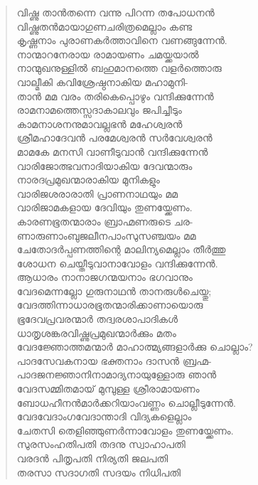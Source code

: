 \begin{verse}
വിഷ്ണു താന്‍തന്നെ വന്നു പിറന്ന തപോധനന്‍\\
വിഷ്ണുതന്‍മായാഗുണചരിത്രമെല്ലാം കണ്ട\\
കൃഷ്ണനാം പുരാണകര്‍ത്താവിനെ വണങ്ങുന്നേന്‍.\\
നാന്മാറനേരായ രാമായണം ചമയ്ക്കയാല്‍\\
നാന്മുഖനുള്ളില്‍ ബഹുമാനത്തെ വളര്‍ത്തൊരു\\
വാല്മീകി കവിശ്രേഷ്ഠനാകിയ മഹാമുനി-\\
താന്‍ മമ വരം തരികെപ്പൊഴും വന്ദിക്കുന്നേന്‍\\
രാമനാമത്തെസ്സദാകാലവും ജപിച്ചീടും\\
കാമനാശനനുമാവല്ലഭന്‍ മഹേശ്വരന്‍\\
ശ്രീമഹാദേവന്‍ പരമേശ്വരന്‍ സര്‍വേശ്വരന്‍\\
മാമകേ മനസി വാണീടുവാന്‍ വന്ദിക്കുന്നേന്‍\\
വാരിജോത്ഭവനാദിയാകിയ ദേവന്മാരും\\
നാരദപ്രമുഖന്മാരാകിയ മുനികളും\\
വാരിജശരാരാതി പ്രാണനാഥയും മമ\\
വാരിജാമകളായ ദേവിയും തുണയ്ക്കേണം.\\
കാരണഭൂതന്മാരാം ബ്രാഹ്മണരുടെ ചര-\\
ണാരുണാംബുജലീനപാംസുസഞ്ചയം മമ\\
ചേതോദര്‍പ്പണത്തിന്റെ മാലിന്യമെല്ലാം തീര്‍ത്തു\\
ശോധന ചെയ്തീടുവാനാവോളം വന്ദിക്കുന്നേന്‍.\\
ആധാരം നാനാജഗന്മയനാം ഭഗവാനും\\
വേദമെന്നല്ലോ ഗുരുനാഥന്‍ താനരുള്‍ചെയ്തു;\\
വേദത്തിന്നാധാരഭൂതന്മാരിക്കാണായൊരു\\
ഭൂദേവപ്രവരന്മാര്‍ തദ്വരശാപാദികള്‍\\
ധാതൃശങ്കരവിഷ്ണുപ്രമുഖന്മാര്‍ക്കും മതം\\
വേദജ്ഞോത്തമന്മാര്‍ മാഹാത്മ്യങ്ങളാര്‍ക്കു ചൊല്ലാം?\\
പാദസേവകനായ ഭക്തനാം ദാസന്‍ ബ്രഹ്മ-\\
പാദജനജ്ഞാനിനാമാദ്യനായുള്ളോരു ഞാന്‍\\
വേദസമ്മിതമായ് മുമ്പുള്ള ശ്രീരാമായണം\\
ബോധഹീനന്‍മാര്‍ക്കറിയാംവണ്ണം ചൊല്ലീടുന്നേന്‍.\\
വേദവേദാംഗവേദാന്താദി വിദ്യകളെല്ലാം\\
ചേതസി തെളിഞ്ഞുണര്‍ന്നാവോളം തുണയ്ക്കേണം.\\
സുരസംഹതിപതി തദനു സ്വാഹാപതി\\
വരദന്‍ പിതൃപതി നിര്യതി ജലപതി\\
തരസാ സദാഗതി സദയം നിധിപതി\\

\end{verse}
